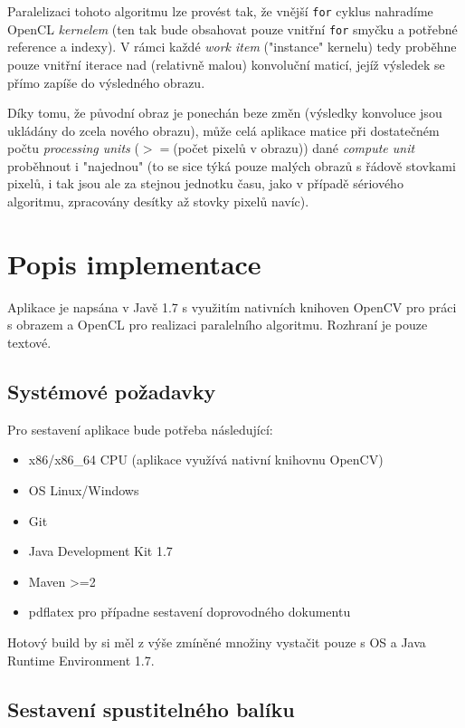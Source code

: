 \documentclass[10pt,a4paper]{article}
\begin{document}
Paralelizaci tohoto algoritmu lze provést tak, že vnější \verb|for| cyklus nahradíme OpenCL \textit{kernelem} (ten tak bude obsahovat pouze vnitřní \verb|for| smyčku a potřebné reference a indexy). V rámci každé \textit{work item} ("instance" kernelu) tedy proběhne pouze vnitřní iterace nad (relativně malou) konvoluční maticí, jejíž výsledek se přímo zapíše do výsledného obrazu. 

Díky tomu, že původní obraz je ponechán beze změn (výsledky konvoluce jsou ukládány do zcela nového obrazu), může celá aplikace matice při dostatečném počtu \textit{processing units} ($>=$(počet pixelů v obrazu)) dané \textit{compute unit} proběhnout i "najednou" (to se sice týká pouze malých obrazů s řádově stovkami pixelů, i tak jsou ale za stejnou jednotku času, jako v případě sériového algoritmu, zpracovány desítky až stovky pixelů navíc).

\section{Popis implementace}

Aplikace je napsána v Javě 1.7 s využitím nativních knihoven OpenCV pro práci s obrazem a OpenCL pro realizaci paralelního algoritmu. Rozhraní je pouze textové.

\subsection{Systémové požadavky}

Pro sestavení aplikace bude potřeba následující:

	\begin{itemize}
		\item x86/x86\_64 CPU (aplikace využívá nativní knihovnu OpenCV)
		\item OS Linux/Windows
		\item Git
		\item Java Development Kit 1.7
		\item Maven >=2
		\item pdflatex pro případne sestavení doprovodného dokumentu
	\end{itemize}

	Hotový build by si měl z výše zmíněné množiny vystačit pouze s OS a Java Runtime Environment 1.7.

\subsection{Sestavení spustitelného balíku}
    
\end{document}
